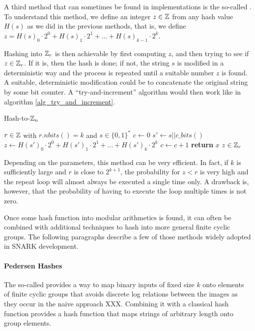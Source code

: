 A third method that can sometimes be found in implementations is the so-called . To understand this method, we define an integer $z\in\mathbb{Z}$ from any hash value $H(s)$ as we did in the previous methods, that is, we define $z = H(s)_0\cdot 2^0 + H(s)_1\cdot 2^1 + \ldots + H(s)_{k-1}\cdot 2^{k}$.

Hashing into $\mathbb{Z}_r$ is then achievable by first computing $z$, and then trying to see if $z\in\mathbb{Z}_r$. If it is, then the hash is done; if not, the string $s$ is modified in a deterministic way and the process is repeated until a suitable number $z$ is found. A suitable, deterministic modification could be to concatenate the original string by some bit counter. A ``try-and-increment'' algorithm would then work like in algorithm \ref{alg_try_and_increment}.
\begin{algorithm}\caption{Hash-to-$\mathbb{Z}_n$}
\label{alg_try_and_increment}
\begin{algorithmic}[0]
\Require $r \in \mathbb{Z}$ with $r.nbits()=k$ and $s\in\{0,1\}^*$
\State $c \gets 0$
\Repeat
\State $s' \gets s||c\_bits()$
\State $z \gets H(s')_0\cdot 2^0 + H(s')_1\cdot 2^1 + \ldots + H(s')_{k}\cdot 2^{k}$
\State $c\gets c+1$
\State \textbf{return} $x$
\EndProcedure
\Ensure $ z\in \mathbb{Z}_r$
\end{algorithmic}
\end{algorithm}

Depending on the parameters, this method can be very efficient. In fact, if $k$ is sufficiently large and $r$ is close to $2^{k+1}$, the probability for $z<r$ is very high and the repeat loop will almost always be executed a single time only. A drawback is, however, that the probability of having to execute the loop multiple times is not zero.

Once some hash function into modular arithmetics is found, it can often be combined with additional techniques to hash into more general finite cyclic groups. The following paragraphs describe a few of those methods widely adopted in SNARK development.\label{hashing-end}
\paragraph{Pedersen Hashes}
The so-called  \citep{Pedersen92} provides a way to map binary inputs of fixed size $k$ onto elements of finite cyclic groups that avoids discrete log relations between the images as they occur in the naive approach XXX. Combining it with a classical hash function provides a hash function that maps strings of arbitrary length onto group elements.

